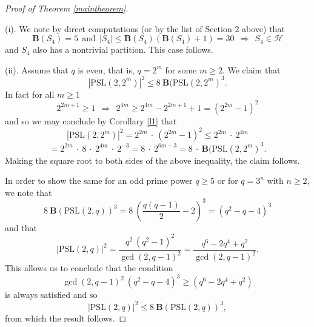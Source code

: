 \documentclass{amsart}
\theoremstyle{definition}
\numberwithin{equation}{section}
\begin{document}
\begin{proof}[Proof of Theorem \ref{maintheorem}]\


(i). We note by direct computations (or by the list of Section 2 above) that   \begin{equation}\mathbf{B}(S_4)=5 \ \ \mathrm{and} \ \ |S_4| \le \mathbf{B}(S_4) (\mathbf{B}(S_4) +1) = 30 \ \ \Longrightarrow \ \ S_4 \in \mathcal{H}
\end{equation}  and  $S_4$ also has a nontrivial partition. This case follows. 

\medskip
\medskip
\medskip
\medskip
\medskip
\medskip
\medskip
\medskip
(ii). Assume that $q$ is even, that is, $q=2^m$ for some $m \ge 2$. We claim that
\begin{equation}|\mathrm{PSL}(2,2^m)|^2  \le  8  \ \mathbf{B}(\mathrm{PSL}(2,2^m)^3.
\end{equation}
In fact for all $m \ge 1$
\begin{equation}2^{2m+1} \ge 1   \ \  \Longrightarrow \  \ 2^{4m} \ge 2^{4m}-2^{2m+1}+1=(2^{2m}-1)^2  
\end{equation}
and so we may conclude by Corollary \ref{l1} that
\begin{equation}\label{extra1}|\mathrm{PSL}(2,2^m)|^2 =  2^{2m} \ \cdot \  (2^{2m}-1)^2 \le 2^{2m}  \ \cdot \ 2^{4m}
\end{equation}
$$=2^{2m} \ \cdot \  8 \ \cdot \ 2^{4m} \  \cdot \ 2^{-3}=8 \ \cdot \ 2^{6m-3} = 8 \ \cdot \ \mathbf{B}(\mathrm{PSL}(2,2^m)^3.$$
Making the square root to both sides of the above inequality,  the claim follows. 




In order to show the same for an odd prime power $q \ge 5$ or for $q=3^n$ with $n \ge 2$, we note that
\begin{equation}8 \ \mathbf{B}(\mathrm{PSL}(2,q))^3 = 8 \  \left(\frac{q(q-1)}{2} -2\right)^3=  (q^2-q-4)^3
\end{equation}
and that
\begin{equation}|\mathrm{PSL}(2,q)|^2= \frac{q^2 \ (q^2-1)^2}{\gcd(2,q-1)^2}= \frac{q^6-2q^4+q^2}{\gcd(2,q-1)^2}.  \end{equation}
This allows us to conclude that the condition
\begin{equation} \gcd(2,q-1)^2 \  (q^2-q-4)^3  \ge  (q^6-2q^4+q^2)
\end{equation} 
is always satisfied and so
\begin{equation}|\mathrm{PSL}(2,q)|^2  \le  8  \ \mathbf{B}(\mathrm{PSL}(2,q))^3,
\end{equation}
from which the result follows. 


\end{proof}
\end{document}
